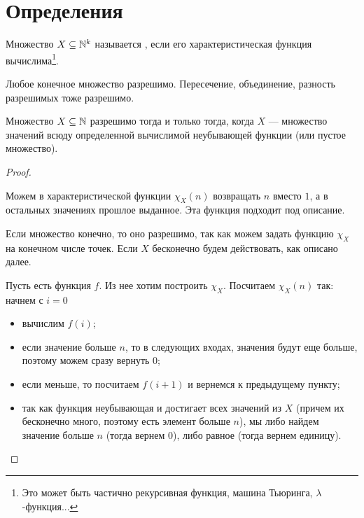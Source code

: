\section{Определения}
\begin{defn}
	Множество $ X \subseteq \mathbb{N}^{k}$ называется , если его характеристическая функция вычислима\footnote{Это может быть частично рекурсивная функция, машина Тьюринга, $ \lambda$-функция...}.
\end{defn}
\begin{note}
    Любое конечное множество разрешимо. Пересечение, объединение, разность разрешимых тоже разрешимо.
\end{note}
\begin{thm}
	Множество $ X \subseteq \mathbb{N}$ разрешимо тогда и только тогда, когда $ X$ --- множество значений всюду определенной вычислимой неубывающей функции (или пустое множество).
\end{thm}
\begin{proof}
	~\begin{description}
		\item {} Можем в характеристической функции $ \chi_{X}(n)$ возвращать $ n$ вместо $ 1$, а в остальных значениях прошлое выданное. Эта функция подходит под описание.
        \item {} 
			Если множество конечно, то оно разрешимо, так как можем задать функцию $ \chi_X$ на конечном числе точек. 
			Если $ X$ бесконечно будем действовать, как описано далее.

			Пусть есть функция $ f$. Из нее хотим построить $ \chi_{X}$. Посчитаем $ \chi_{X}(n)$ так: 
			начнем с $ i = 0$
			\begin{itemize}
				\item вычислим $ f(i)$;
				\item если значение больше $ n$, то в следующих входах, значения будут еще больше, поэтому можем сразу вернуть  0;
				\item если меньше, то посчитаем $ f(i+1)$ и вернемся к предыдущему пункту;
				\item так как функция неубывающая и достигает всех значений из $ X$ (причем их бесконечно много, поэтому есть элемент больше $ n$), мы либо найдем значение больше $ n$ (тогда вернем $ 0$), либо равное (тогда вернем единицу).
			\end{itemize}
    \end{description} 
\end{proof}



